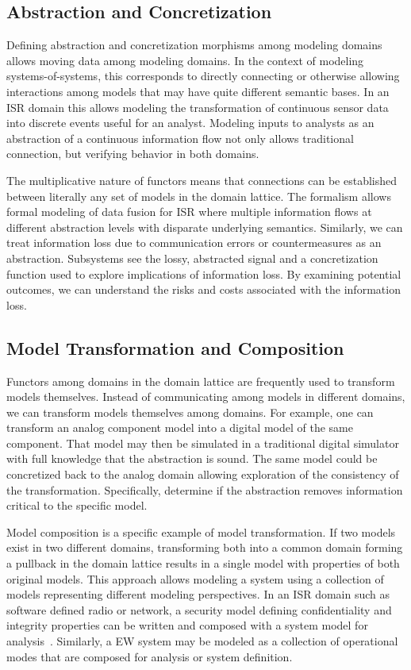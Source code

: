 \documentclass[12pt]{article}
\begin{document}
\subsection{Abstraction and Concretization}

Defining abstraction and concretization morphisms among modeling
domains allows moving data among modeling domains.  In the context of
modeling systems-of-systems, this corresponds to directly connecting
or otherwise allowing interactions among models that may have quite
different semantic bases.  In an ISR domain this allows modeling the
transformation of continuous sensor data into discrete events useful
for an analyst.  Modeling inputs to analysts as an abstraction of a
continuous information flow not only allows traditional connection,
but verifying behavior in both domains.

The multiplicative nature of functors means that connections can be
established between literally any set of models in the domain lattice.
The formalism allows formal modeling of data fusion for ISR where
multiple information flows at different abstraction levels with
disparate underlying semantics.  Similarly, we can treat information
loss due to communication errors or countermeasures as an abstraction.
Subsystems see the lossy, abstracted signal and a concretization
function used to explore implications of information loss.  By
examining potential outcomes, we can understand the risks and costs
associated with the information loss.

\subsection{Model Transformation and Composition}

Functors among domains in the domain lattice are frequently used to
transform models themselves.  Instead of communicating among models in
different domains, we can transform models themselves among domains.
For example, one can transform an analog component model into a
digital model of the same component.  That model may then be simulated
in a traditional digital simulator with full knowledge that the
abstraction is sound.  The same model could be concretized back to the
analog domain allowing exploration of the consistency of the
transformation.  Specifically, determine if the abstraction removes
information critical to the specific model.

Model composition is a specific example of model transformation.  If
two models exist in two different domains, transforming both into a
common domain forming a pullback in the domain lattice results in a
single model with properties of both original models.  This approach
allows modeling a system using a collection of models representing
different modeling perspectives. In an ISR domain such as software
defined radio or network, a security model defining confidentiality
and integrity properties can be written and composed with a system
model for analysis~\cite{Kimmell:08:System-Synthesi}.  Similarly, a EW
system may be modeled as a collection of operational modes that are
composed for analysis or system definition.
\end{document}
